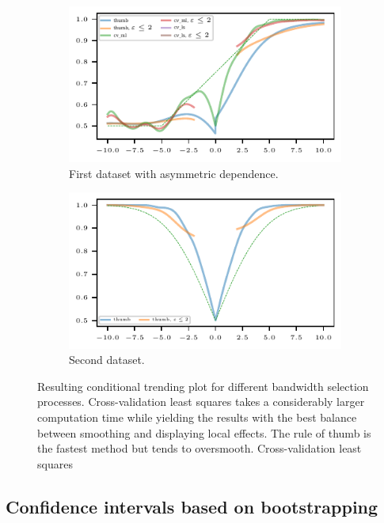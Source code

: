 \begin{figure}
    \centering
    \begin{subfigure}{.48\textwidth}
        \includegraphics{plots/illustrative_examples/cond_prob_plot_bw_asym_butterfly}
        \caption{First dataset with asymmetric dependence.}
    \end{subfigure}
    \begin{subfigure}{.48\textwidth}
        \includegraphics{plots/illustrative_examples/cond_prob_plot_bw_normal}
        \caption{Second dataset. }
    \end{subfigure}
    \caption{Resulting conditional trending plot for different bandwidth selection processes. Cross-validation least squares takes a considerably larger computation time while yielding the results with the best balance between smoothing and displaying local effects. The rule of thumb is the fastest method but tends to oversmooth. Cross-validation least squares  }\label{fig:trending-cond-prob-bw}
\end{figure}


\subsection{Confidence intervals based on bootstrapping}\label{subsec:trending-bootstrap}

